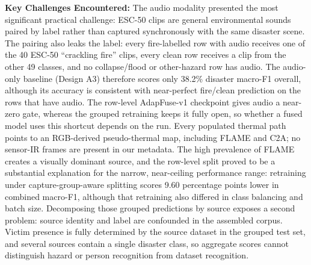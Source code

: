 \textbf{Key Challenges Encountered:}
The audio modality presented the most significant practical challenge: ESC-50 clips are general environmental sounds paired by label rather than captured synchronously with the same disaster scene. The pairing also leaks the label: every fire-labelled row with audio receives one of the 40 ESC-50 ``crackling fire'' clips, every clean row receives a clip from the other 49 classes, and no collapse/flood or other-hazard row has audio. The audio-only baseline (Design A3) therefore scores only 38.2\% disaster macro-F1 overall, although its accuracy is consistent with near-perfect fire/clean prediction on the rows that have audio. The row-level AdapFuse-v1 checkpoint gives audio a near-zero gate, whereas the grouped retraining keeps it fully open, so whether a fused model uses this shortcut depends on the run. Every populated thermal path points to an RGB-derived pseudo-thermal map, including FLAME and C2A; no sensor-IR frames are present in our metadata. The high prevalence of FLAME creates a visually dominant source, and the row-level split proved to be a substantial explanation for the narrow, near-ceiling performance range: retraining under capture-group-aware splitting scores 9.60 percentage points lower in combined macro-F1, although that retraining also differed in class balancing and batch size. Decomposing those grouped predictions by source exposes a second problem: source identity and label are confounded in the assembled corpus. Victim presence is fully determined by the source dataset in the grouped test set, and several sources contain a single disaster class, so aggregate scores cannot distinguish hazard or person recognition from dataset recognition.
